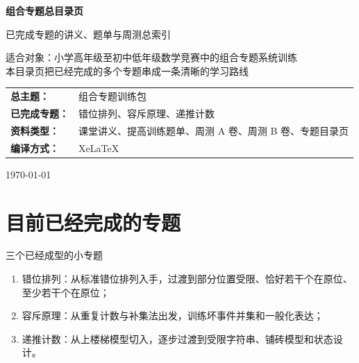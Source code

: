 \documentclass[11pt,a4paper,fontset=fandol]{ctexart}
\begin{document}
\thispagestyle{empty}
\begin{titlepage}
\centering
\vspace*{0.9cm}

\begin{tcolorbox}[
  enhanced,
  width=0.92\textwidth,
  colback=white,
  colframe=mainblue,
  boxrule=1pt,
  arc=0mm,
  left=6mm,
  right=6mm,
  top=8mm,
  bottom=8mm
]
\centering

{\fontsize{24}{30}\selectfont\bfseries 组合专题总目录页\par}
\vspace{0.65cm}
{\fontsize{17}{22}\selectfont 已完成专题的讲义、题单与周测总索引\par}

\vspace{1cm}
\begin{tcolorbox}[colback=lightblue,colframe=mainblue,width=0.84\textwidth,boxrule=1pt]
\centering
{\large 适合对象：小学高年级至初中低年级数学竞赛中的组合专题系统训练}\\[0.35em]
{\normalsize 本目录页把已经完成的多个专题串成一条清晰的学习路线}
\end{tcolorbox}

\vspace{1.0cm}
\renewcommand{\arraystretch}{1.42}
\begin{tabular}{>{\bfseries}p{3.5cm}p{8cm}}
总主题： & 组合专题训练包 \\
已完成专题： & 错位排列、容斥原理、递推计数 \\
资料类型： & 课堂讲义、提高训练题单、周测 A 卷、周测 B 卷、专题目录页 \\
编译方式： & XeLaTeX \\
\end{tabular}

\vspace{0.9cm}
{\large \today\par}
\end{tcolorbox}
\end{titlepage}

\tableofcontents
\newpage

\section{目前已经完成的专题}

\begin{goalbox}{三个已经成型的小专题}
\begin{enumerate}
  \item 错位排列：从标准错位排列入手，过渡到部分位置受限、恰好若干个在原位、至少若干个在原位；
  \item 容斥原理：从重复计数与补集法出发，训练坏事件并集和一般化表达；
  \item 递推计数：从上楼梯模型切入，逐步过渡到受限字符串、铺砖模型和状态设计。
\end{enumerate}
\end{goalbox}
\end{document}

